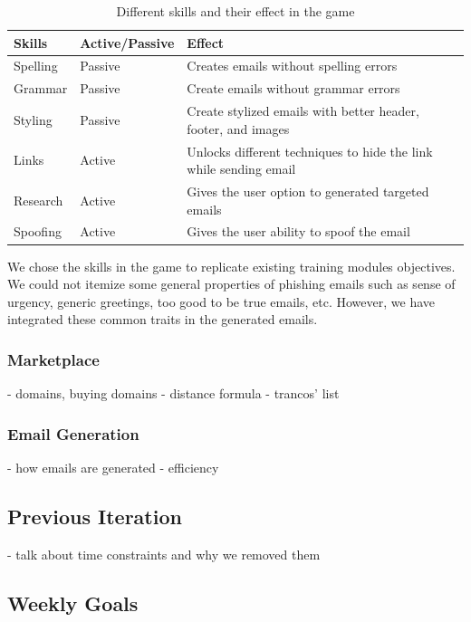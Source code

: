 \begin{table}[h]
    \begin{tabular}{  p{}  p{}  p{}  }
        \hline
        \textbf{Skills} & \textbf{Active/Passive} & \textbf{Effect}                                                   \\
        \hline
        Spelling        & Passive                 & Creates emails without spelling errors                            \\
        Grammar         & Passive                 & Create emails without grammar errors                              \\
        Styling         & Passive                 & Create stylized emails with better header, footer, and images     \\
        Links           & Active                  & Unlocks different techniques to hide the link while sending email \\
        Research        & Active                  & Gives the user option to generated targeted emails                \\
        Spoofing        & Active                  & Gives the user ability to spoof the email                         \\
        \hline
    \end{tabular}
    \caption{Different skills and their effect in the game}
    \label{table:attacker}
\end{table}

We chose the skills in the game to replicate existing training modules objectives. We could not itemize some general properties of phishing emails such as sense of urgency, generic greetings, too good to be true emails, etc. However, we have integrated these common traits in the generated emails.

\subsubsection{Marketplace}
- domains, buying domains
- distance formula
- trancos' list

\subsubsection{Email Generation}
- how emails are generated
- efficiency


\subsection{Previous Iteration}
- talk about time constraints and why we removed them

\subsection{Weekly Goals}


